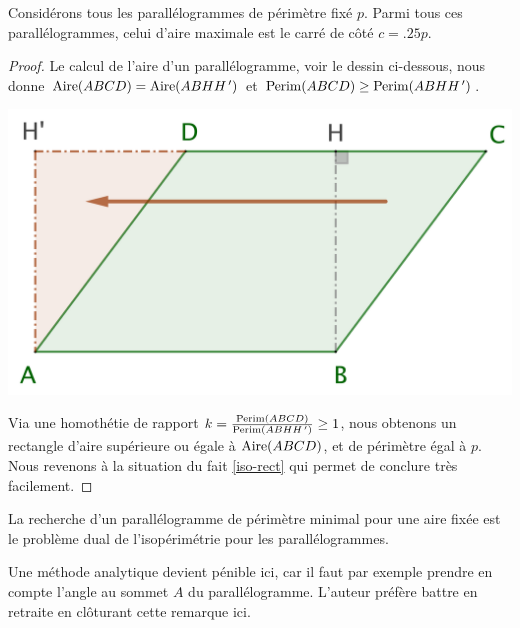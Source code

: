 \begin{fact} \label{iso-para}
	Considérons tous les parallélogrammes de périmètre fixé $p$. Parmi tous ces parallélogrammes, celui d'aire maximale est le carré de côté $c = \num{.25} p$.
\end{fact}


\begin{proof}
	Le calcul de l'aire d'un parallélogramme, voir le dessin ci-dessous, nous donne 
	$\mathrm{Aire}(ABCD) = \mathrm{Aire}(ABHH^{\,\prime})$ et 
	$\mathrm{Perim}(ABCD) \geq \mathrm{Perim}(ABHH^{\,\prime})$.	

	\begin{center}
		\includegraphics[scale=.4]{content/parallelogram/parallelogram.png}
	\end{center}
	
	Via une homothétie de rapport $k = \frac{\mathrm{Perim}(ABCD)}{\mathrm{Perim}(ABHH^{\,\prime})} \geq 1$, nous obtenons un rectangle d'aire supérieure ou égale à $\mathrm{Aire}(ABCD)$, et de périmètre égal à $p$. Nous revenons à la situation du fait \ref{iso-rect} qui permet de conclure très facilement.
\end{proof}


\begin{remark}
	La recherche d'un parallélogramme de périmètre minimal pour une aire fixée est le problème dual de l'isopérimétrie pour les parallélogrammes.
\end{remark}


\begin{remark}
	Une méthode analytique devient pénible ici, car il faut par exemple prendre en compte l'angle au sommet $A$ du parallélogramme. L'auteur préfère battre en retraite en clôturant cette remarque ici.
\end{remark}
